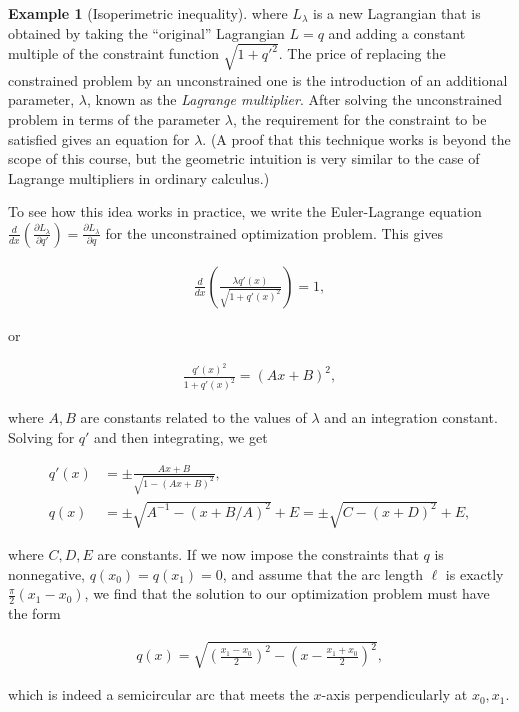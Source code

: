 \documentclass[11pt]{report}
\theoremstyle{plain}
\theoremstyle{definition}
\newtheorem{example}[thm]{Example}
\begin{document}
\begin{example}[Isoperimetric inequality]
\noindent where $L_\lambda$ is a new Lagrangian that is obtained
by taking the ``original'' Lagrangian $L=q$ and adding
a constant multiple of the constraint function
$\sqrt{1+q'^2}$. The price of replacing the
constrained problem by an unconstrained one is the
introduction of an additional parameter, $\lambda$,
known as the \emph{Lagrange multiplier}. After solving the
unconstrained problem in terms of the parameter
$\lambda$, the requirement for the constraint to be
satisfied gives an equation for $\lambda$. (A proof
that this technique works is beyond the scope of this
course, but the geometric intuition is very similar to
the case of Lagrange multipliers in ordinary
calculus.)

To see how this idea works in practice, we write the
Euler-Lagrange equation
$\frac{d}{dx}\left(\frac{\partial L_\lambda}{\partial
q'}\right) = \frac{\partial L_\lambda}{\partial q}$
for the unconstrained optimization problem. This gives

\begin{align*}
\frac{d}{dx}\left( \frac{\lambda q'(x)}{\sqrt{1+q'(x)^2}}\right) = 1,
\end{align*}

\noindent or

\begin{align*}
\frac{q'(x)^2}{1+q'(x)^2} = (Ax+B)^2,
\end{align*}

\noindent where $A,B$ are constants related to the values of
$\lambda$ and an integration constant. Solving for
$q'$ and then integrating, we get

\begin{align*}
q'(x) &= \pm \frac{Ax+B}{\sqrt{1-(Ax+B)^2}}, \\
q(x) &= \pm \sqrt{A^{-1}-(x+B/A)^2}+E = \pm \sqrt{C-(x+D)^2} + E,
\end{align*}

\noindent where $C,D,E$ are constants. If we now impose the
constraints that $q$ is nonnegative,
$q(x_0)=q(x_1)=0$, and assume that the arc length
$\ell$ is exactly $\frac{\pi}{2}(x_1-x_0)$, we find
that the solution to our optimization problem must
have the form

\begin{align*}
q(x) = \sqrt{\left(\frac{x_1-x_0}{2}\right)^2 - \left(x-\frac{x_1+x_0}{2}\right)^2},
\end{align*}

\noindent which is indeed a semicircular arc that meets the
$x$-axis perpendicularly at $x_0,x_1$.
\end{example}
\end{document}
